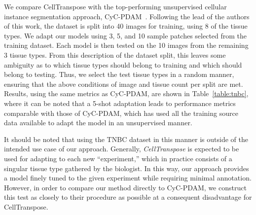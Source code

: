 We compare CellTranspose with the top-performing unsupervised cellular instance segmentation approach, CyC-PDAM~\cite{Liu2020-qh}. Following the lead of the authors of this work, the dataset is split into 40 images for training, using 8 of the tissue types. We adapt our models using 3, 5, and 10 sample patches selected from the training dataset. Each model is then tested on the 10 images from the remaining 3 tissue types. From this description of the dataset split, this leaves some ambiguity as to which tissue types should belong to training and which should belong to testing. Thus, we select the test tissue types in a random manner, ensuring that the above conditions of image and tissue count per split are met. Results, using the same metrics as CyC-PDAM, are shown in Table~\ref{table:tnbc}, where it can be noted that a 5-shot adaptation leads to performance metrics comparable with those of CyC-PDAM, which has used all the training source data available to adapt the model in an unsupervised manner.

It should be noted that using the TNBC dataset in this manner is outside of the intended use case of our approach. Generally, \emph{CellTranspose} is expected to be used for adapting to each new ``experiment,'' which in practice consists of a singular tissue type gathered by the biologist. In this way, our approach provides a model finely tuned to the given experiment while requiring minimal annotation. However, in order to compare our method directly to CyC-PDAM, we construct this test as closely to their procedure as possible at a consequent disadvantage for CellTranspose.

